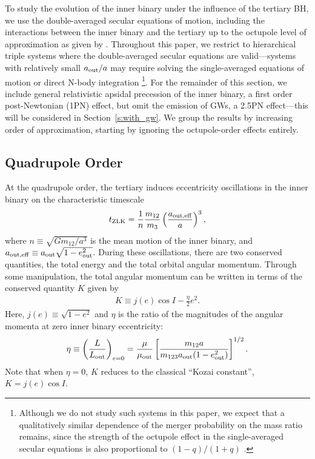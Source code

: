 \documentclass[
        fleqn,
        usenatbib,
    ]{mnras}
\newcommand*{\p}[1]{\left(#1\right)}
\newcommand*{\s}[1]{\left[#1\right]}
\begin{document}
To study the evolution of the inner binary under the influence of the tertiary
BH, we use the double-averaged secular equations of motion, including the
interactions between the inner binary and the tertiary up to the octupole level
of approximation as given by \citet{LML15}. Throughout this paper, we restrict
to hierarchical triple systems where the double-averaged secular equations are
valid---systems with relatively small $a_{\rm out}/a$ may require solving the
single-averaged equations of motion or direct N-body integration
\citep[see][]{bin_misc5, LL19}\footnote{
Although we do not study such systems in this paper, we expect that a
qualitatively similar dependence of the merger probability on the mass ratio
remains, since the strength of the octupole effect in the single-averaged
secular equations is also proportional to $(1-q)/(1+q)$ \citep[see Eq.~25
of][]{bin_misc5}.}. For the remainder of this section, we include general
relativistic apsidal precession of the inner binary, a first order
post-Newtonian (1PN) effect, but omit the emission of GWs, a 2.5PN effect---this
will be considered in Section~\ref{s:with_gw}. We group the results by
increasing order of approximation, starting by ignoring the octupole-order
effects entirely.

\subsection{Quadrupole Order}

At the quadrupole order, the tertiary induces eccentricity oscillations in the
inner binary on the characteristic timescale
\begin{align}
    t_{\rm ZLK} = \frac{1}{n}\frac{m_{12}}{m_3}
            \p{\frac{a_{\rm out, eff}}{a}}^3,\label{eq:def_tzlk}
\end{align}
where $n \equiv \sqrt{Gm_{12} / a^3}$ is the mean motion of the inner binary,
and $a_{\rm out, eff} \equiv a_{\rm out}\sqrt{1 - e_{\rm out}^2}$. During these
oscillations, there are two conserved quantities, the total energy and the total
orbital angular momentum. Through some manipulation, the total angular momentum
can be written in terms of the conserved quantity $K$ given by
\begin{align}
    K \equiv j(e) \cos I - \frac{\eta}{2}e^2.\label{eq:def_K}
\end{align}
Here, $j(e) \equiv \sqrt{1 - e^2}$ and $\eta$ is the ratio of the magnitudes of
the angular momenta at zero inner binary eccentricity:
\begin{align}
    \eta \equiv \p{\frac{L}{L_{\rm out}}}_{e = 0}
        = \frac{\mu}{\mu_{\rm out}}\s{\frac{m_{12}a}
            {m_{123}a_{\rm out}(1 - e_{\rm out}^2)}}^{1/2}.\label{eq:def_eta}
\end{align}
Note that when $\eta = 0$, $K$ reduces to the classical ``Kozai constant'', $K =
j(e) \cos I$.
\end{document}
